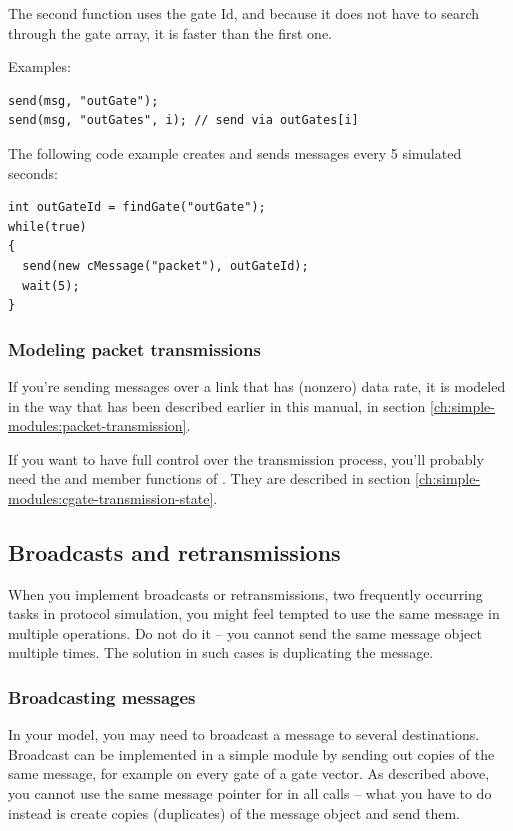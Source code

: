 The second function uses the gate Id, and because it does
not have to search through the gate array, it is faster than
the first one.

Examples:

\begin{verbatim}
send(msg, "outGate");
send(msg, "outGates", i); // send via outGates[i]
\end{verbatim}

The following code example creates and sends messages
every 5 simulated seconds:

\begin{verbatim}
int outGateId = findGate("outGate");
while(true)
{
  send(new cMessage("packet"), outGateId);
  wait(5);
}
\end{verbatim}


\subsubsection{Modeling packet transmissions}

If you're sending messages over a link that has (nonzero) data rate,
it is modeled in the way that has been described earlier in this
manual, in section \ref{ch:simple-modules:packet-transmission}.

If you want to have full control over the transmission process,
you'll probably need the  and 
member functions of . They are described in section
\ref{ch:simple-modules:cgate-transmission-state}.



\subsection{Broadcasts and retransmissions}

When you implement broadcasts or retransmissions, two frequently
occurring tasks in protocol simulation, you might feel tempted
to use the same message in multiple  operations.
Do not do it -- you cannot send the same message object multiple times.
The solution in such cases is duplicating the message.

\subsubsection{Broadcasting messages}

In your model, you may need to broadcast a message to several destinations.
Broadcast can be implemented in a simple module by sending out copies
of the same message, for example on every gate of a gate vector.
As described above, you cannot use the same message pointer for
in all  calls -- what you have to do instead is
create copies (duplicates) of the message object and send them.

